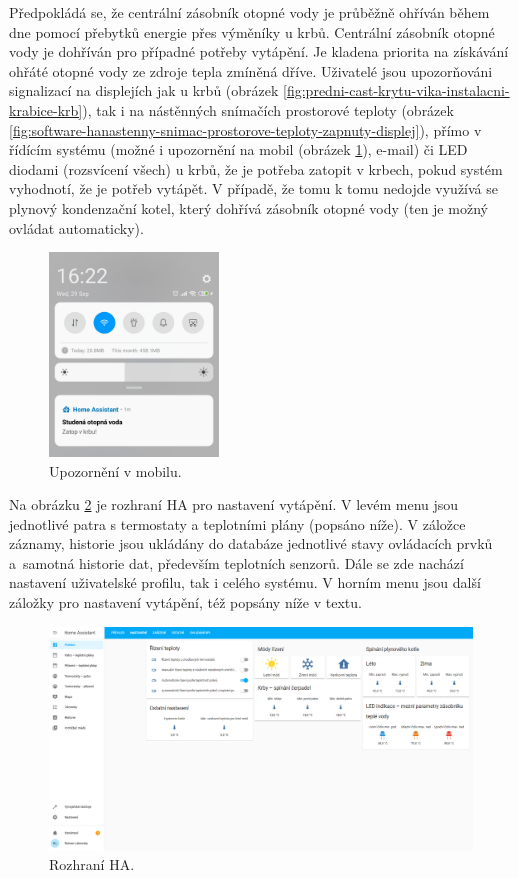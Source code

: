 Předpokládá se, že centrální zásobník otopné vody je průběžně ohříván během dne pomocí přebytků energie přes výměníky u krbů. Centrální zásobník otopné vody je dohříván pro případné potřeby vytápění. Je kladena priorita na získávání ohřáté otopné vody ze zdroje tepla zmíněná dříve. Uživatelé jsou upozorňováni signalizací na displejích jak u krbů (obrázek \ref{fig:predni-cast-krytu-vika-instalacni-krabice-krb}), tak i na nástěnných snímačích prostorové teploty (obrázek \ref{fig:software-hanastenny-snimac-prostorove-teploty-zapnuty-displej}), přímo v řídícím systému (možné i upozornění  na mobil (obrázek \ref{fig:mobil-notifikace}), e-mail) či LED diodami (rozsvícení všech) u krbů, že je potřeba zatopit v krbech, pokud systém vyhodnotí, že je potřeb vytápět. V případě, že tomu k tomu nedojde využívá se plynový kondenzační kotel, který dohřívá zásobník otopné vody (ten je možný ovládat automaticky).

\begin{figure}[H]
    \centering
    \includegraphics[width=0.4\textwidth]{images/software-ha/mobil-notifikace.png}
    \caption{Upozornění v mobilu.}
    \label{fig:mobil-notifikace}
\end{figure}

Na obrázku \ref{fig:prehled-ha} je rozhraní HA pro nastavení vytápění. V levém menu jsou jednotlivé patra s termostaty a teplotními plány (popsáno níže). V záložce záznamy, historie jsou ukládány do databáze jednotlivé stavy ovládacích prvků a~samotná historie dat, především teplotních senzorů. Dále se zde nachází nastavení uživatelské profilu, tak i celého systému. V horním menu jsou další záložky pro nastavení vytápění, též popsány níže v textu.

\begin{figure}[H]
    \centering
    \includegraphics[width=\textwidth]{images/software-ha/prehled-ha.png}
    \caption{Rozhraní HA.}
    \label{fig:prehled-ha}
\end{figure}

